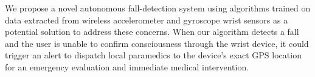 \documentclass{llncs}
\begin{document}
	We propose a novel autonomous fall-detection system using algorithms trained on data extracted from wireless accelerometer and gyroscope wrist sensors as a potential solution to address these concerns. When our algorithm detects a fall and the user is unable to confirm consciousness through the wrist device, it could trigger an alert to dispatch local paramedics to the device's exact GPS location for an emergency evaluation and immediate medical intervention. %




%
%


 {}
 

\end{document}
